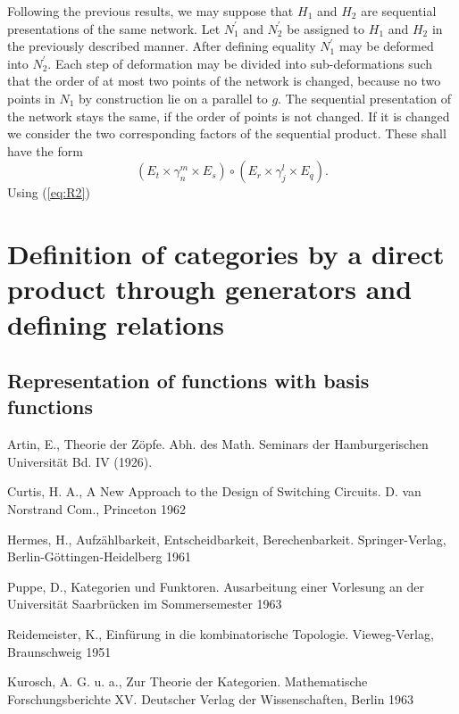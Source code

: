 \documentclass{article}
\begin{document}
Following the previous results, we may suppose that $H_1$ and $H_2$ are sequential presentations of the same network. Let $N_1^{'}$ and $N_2^{'}$ be assigned to $H_1$ and $H_2$ in the previously described manner. After defining equality $N_1^{'}$ may be deformed into $N_2^{'}$. Each step of deformation may be divided into sub-deformations such that the order of at most two points of the network is changed, because no two points in $N_1$ by construction lie on a parallel to $g$. The sequential
presentation of the network stays the same, if the order of points is not changed. If it is changed we consider the two corresponding factors of the sequential product. These shall have the form
\[
(E_t \times \gamma_n^m \times E_s) \circ (E_r \times \gamma_j^l \times E_q).
\]
Using (\ref{eq:R2})


\section{Definition of categories by a direct product through generators and defining relations}
\subsection{Representation of functions with basis functions}
\label{basis-function-representation}

\begin{thebibliography}{9}
Artin, E., Theorie der Zöpfe. Abh. des Math. Seminars der Hamburgerischen Universit\"{a}t Bd. IV (1926).

Curtis, H. A., A New Approach to the Design of Switching Circuits. D. van Norstrand Com., Princeton 1962

Hermes, H., Aufz\"{a}hlbarkeit, Entscheidbarkeit, Berechenbarkeit. Springer-Verlag, Berlin-G\"{o}ttingen-Heidelberg 1961

Puppe, D., Kategorien und Funktoren. Ausarbeitung einer Vorlesung an der Universit\"{a}t Saarbr\"{u}cken im Sommersemester 1963

Reidemeister, K., Einf\"{u}rung in die kombinatorische Topologie. Vieweg-Verlag, Braunschweig 1951

Kurosch, A. G. u. a., Zur Theorie der Kategorien. Mathematische Forschungsberichte XV. Deutscher Verlag der Wissenschaften, Berlin 1963
\end{thebibliography}
\end{document}
